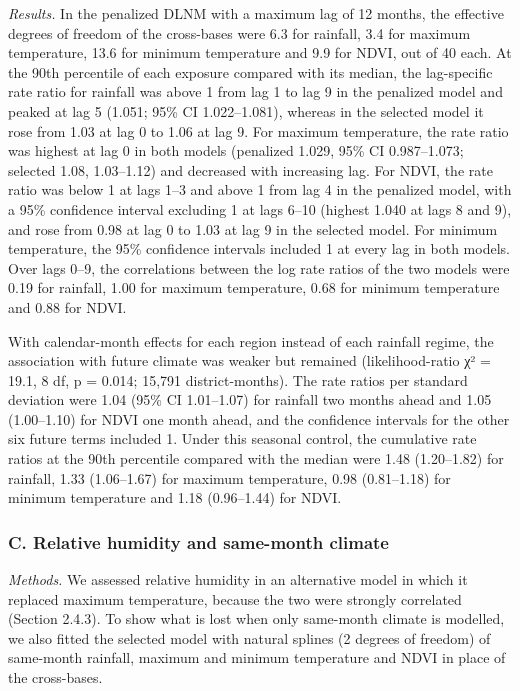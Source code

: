 \documentclass[11pt,a4paper]{article}
\begin{document}
\emph{Results.} In the penalized DLNM with a maximum lag of 12 months, the effective degrees of freedom of the cross-bases were 6.3 for rainfall, 3.4 for maximum temperature, 13.6 for minimum temperature and 9.9 for NDVI, out of 40 each. At the 90th percentile of each exposure compared with its median, the lag-specific rate ratio for rainfall was above 1 from lag 1 to lag 9 in the penalized model and peaked at lag 5 (1.051; 95\% CI 1.022--1.081), whereas in the selected model it rose from 1.03 at lag 0 to 1.06 at lag 9. For maximum temperature, the rate ratio was highest at lag 0 in both models (penalized 1.029, 95\% CI 0.987--1.073; selected 1.08, 1.03--1.12) and decreased with increasing lag. For NDVI, the rate ratio was below 1 at lags 1--3 and above 1 from lag 4 in the penalized model, with a 95\% confidence interval excluding 1 at lags 6--10 (highest 1.040 at lags 8 and 9), and rose from 0.98 at lag 0 to 1.03 at lag 9 in the selected model. For minimum temperature, the 95\% confidence intervals included 1 at every lag in both models. Over lags 0--9, the correlations between the log rate ratios of the two models were 0.19 for rainfall, 1.00 for maximum temperature, 0.68 for minimum temperature and 0.88 for NDVI.

With calendar-month effects for each region instead of each rainfall regime, the association with future climate was weaker but remained (likelihood-ratio χ² = 19.1, 8 df, p = 0.014; 15,791 district-months). The rate ratios per standard deviation were 1.04 (95\% CI 1.01--1.07) for rainfall two months ahead and 1.05 (1.00--1.10) for NDVI one month ahead, and the confidence intervals for the other six future terms included 1. Under this seasonal control, the cumulative rate ratios at the 90th percentile compared with the median were 1.48 (1.20--1.82) for rainfall, 1.33 (1.06--1.67) for maximum temperature, 0.98 (0.81--1.18) for minimum temperature and 1.18 (0.96--1.44) for NDVI.

\label{s1text-c}

\subsubsection*{C. Relative humidity and same-month climate}

\emph{Methods.} We assessed relative humidity in an alternative model in which it replaced maximum temperature, because the two were strongly correlated (Section 2.4.3). To show what is lost when only same-month climate is modelled, we also fitted the selected model with natural splines (2 degrees of freedom) of same-month rainfall, maximum and minimum temperature and NDVI in place of the cross-bases.
\end{document}
